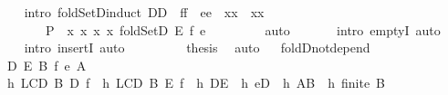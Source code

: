 \begin{isabellebody}
\ \ \ \ \isamarkupfalse%
\ {\isacharparenleft}intro\ foldSetD{\isachardot}induct{\isacharbrackleft}\ {\isacharquery}D{\isacharequal}{\isachardoublequoteopen}D{\isachardoublequoteclose}\ \ {\isacharquery}f{\isacharequal}{\isachardoublequoteopen}f{\isachardoublequoteclose}\ \ {\isacharquery}e{\isacharequal}{\isachardoublequoteopen}e{\isachardoublequoteclose}\ \ {\isacharquery}x{}{\isachardot}{}{\isacharequal}{\isachardoublequoteopen}x{}{\isachardoublequoteclose}\ \ {\isacharquery}x{}{\isachardot}{}{\isacharequal}{\isachardoublequoteopen}x{}{\isachardoublequoteclose}\isanewline
\ \ \ \ \ \ \ \ \ {\isacharquery}P\ {\isacharequal}\ {\isachardoublequoteopen}{\isasymlambda}x{}\ x{}{\isachardot}\ {\isacharparenleft}{\isacharparenleft}x{}{\isacharcomma}\ x{}{\isacharparenright}{\isasymin}\ foldSetD\ E\ f\ e{\isacharparenright}{\isachardoublequoteclose}{\isacharbrackright}{\isacharparenright}\ \isanewline
\ \ \ \ \ \ \isamarkupfalse%
\ auto\isanewline
\ \ \ \ \ \isamarkupfalse%
\ {\isacharparenleft}intro\ emptyI{\isacharcomma}\ auto{\isacharparenright}\isanewline
\ \ \ \ \isamarkupfalse%
\ {\isacharparenleft}intro\ insertI{\isacharcomma}\ auto{\isacharparenright}\isanewline
\ \ \isamarkupfalse%
\isanewline
\ \ \isamarkupfalse%
\ {}\ \isamarkupfalse%
\ {\isacharquery}thesis\ \isamarkupfalse%
\ auto\isanewline
{}\isamarkupfalse%
%
\endisatagproof
{\isafoldproof}%
%
\isadelimproof
\ \isanewline
%
\endisadelimproof
\isanewline
{}\isamarkupfalse%
\ foldD{\isacharunderscore}not{\isacharunderscore}depend{\isacharcolon}\isanewline
\ \ \ D\ E\ B\ f\ e\ A\isanewline
\ \ \ h{}{\isacharcolon}\ {\isachardoublequoteopen}LCD\ B\ D\ f{\isachardoublequoteclose}\ \ h{}{\isacharcolon}\ {\isachardoublequoteopen}LCD\ B\ E\ f{\isachardoublequoteclose}\ \ h{}{\isacharcolon}\ {\isachardoublequoteopen}D{\isasymsubseteq}E{\isachardoublequoteclose}\ \ h{}{\isacharcolon}\ {\isachardoublequoteopen}e{\isasymin}D{\isachardoublequoteclose}\ \ h{}{\isacharcolon}\ {\isachardoublequoteopen}A{\isasymsubseteq}B{\isachardoublequoteclose}\ \ h{}{\isacharcolon}\ {\isachardoublequoteopen}finite\ B{\isachardoublequoteclose}\isanewline

\end{isabellebody}
